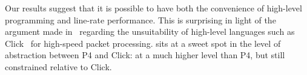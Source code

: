 Our results suggest that it is possible to have both the convenience of
high-level programming and line-rate performance. This is surprising in light
of the argument made in~\cite{p4} regarding the unsuitability of high-level
languages such as Click~\cite{click} for high-speed packet processing.
\pktlanguage sits at a sweet spot in the level of abstraction between P4 and
Click: at a much higher level than P4, but still constrained relative to Click.
